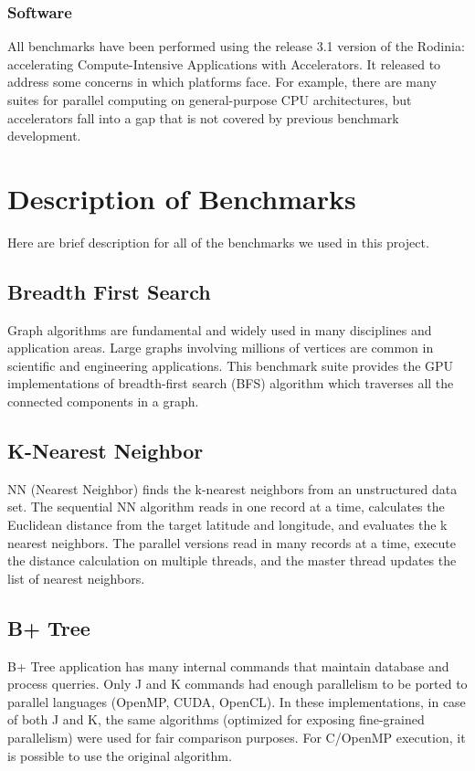 \documentclass[paper=a4, fontsize=11pt]{scrartcl}
\numberwithin{equation}{section}		%
\numberwithin{figure}{section}			%
\numberwithin{table}{section}				%
\begin{document}
\subsubsection{Software}
All benchmarks have been performed using the release 3.1 version of the Rodinia: accelerating Compute-Intensive Applications with Accelerators. It released to address some concerns in  which platforms face. For example, there are many suites for parallel computing on general-purpose CPU architectures, but accelerators fall into a gap that is not covered by previous benchmark development.
\newpage
\section{Description of Benchmarks}
Here are brief description for all of the benchmarks we used in this project.

\subsection{Breadth First Search}
Graph algorithms are fundamental and widely used in many disciplines and application areas. Large graphs involving millions of vertices are common in scientific and engineering applications. This benchmark suite provides the GPU implementations of breadth-first search (BFS) algorithm which traverses all the connected components in a graph.

\subsection{K-Nearest Neighbor}
NN (Nearest Neighbor) finds the k-nearest neighbors from an unstructured data set. The sequential NN algorithm reads in one record at a time, calculates the Euclidean distance from the target latitude and longitude, and evaluates the k nearest neighbors. The parallel versions read in many records at a time, execute the distance calculation on multiple threads, and the master thread updates the list of nearest neighbors.

\subsection{B+ Tree}
B+ Tree application has many internal commands that maintain database and process querries. Only J and K commands had enough parallelism to be ported to parallel languages (OpenMP, CUDA, OpenCL). In these implementations, in case of both J and K, the same algorithms (optimized for exposing fine-grained parallelism) were used for fair comparison purposes. For C/OpenMP execution, it is possible to use the original algorithm.
\end{document}
